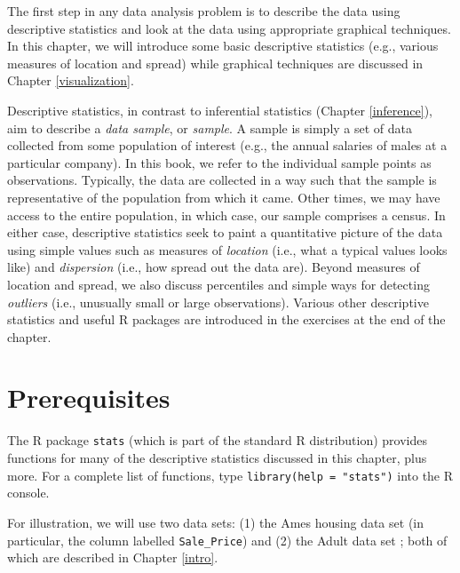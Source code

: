 \documentclass[]{book}
\theoremstyle{definition}
\theoremstyle{definition}
\theoremstyle{definition}
\theoremstyle{remark}
\begin{document}
The first step in any data analysis problem is to describe the data
using descriptive statistics and look at the data using appropriate
graphical techniques. In this chapter, we will introduce some basic
descriptive statistics (e.g., various measures of location and spread)
while graphical techniques are discussed in Chapter \ref{visualization}.

Descriptive statistics, in contrast to inferential statistics (Chapter
\ref{inference}), aim to describe a \emph{data sample}, or
\emph{sample}. A sample is simply a set of data collected from some
population of interest (e.g., the annual salaries of males at a
particular company). In this book, we refer to the individual sample
points as observations. Typically, the data are collected in a way such
that the sample is representative of the population from which it came.
Other times, we may have access to the entire population, in which case,
our sample comprises a census. In either case, descriptive statistics
seek to paint a quantitative picture of the data using simple values
such as measures of \emph{location} (i.e., what a typical values looks
like) and \emph{dispersion} (i.e., how spread out the data are). Beyond
measures of location and spread, we also discuss percentiles and simple
ways for detecting \emph{outliers} (i.e., unusually small or large
observations). Various other descriptive statistics and useful R
packages are introduced in the exercises at the end of the chapter.

\hypertarget{prerequisites}{%
\section{Prerequisites}\label{prerequisites}}

The R package \texttt{stats} (which is part of the standard R
distribution) provides functions for many of the descriptive statistics
discussed in this chapter, plus more. For a complete list of functions,
type \texttt{library(help\ =\ "stats")} into the R console.

For illustration, we will use two data sets: (1) the Ames housing data
set \citep{ames-cock-2011} (in particular, the column labelled
\texttt{Sale\_Price}) and (2) the Adult data set \citep{uci}; both of
which are described in Chapter \ref{intro}.
\end{document}
